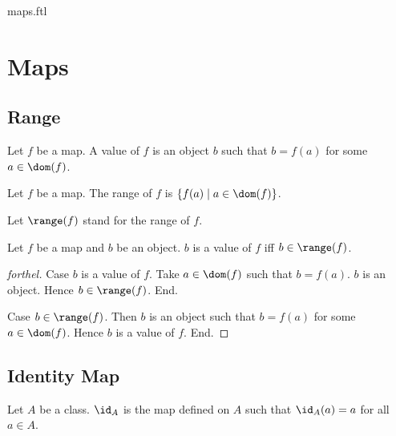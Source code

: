 \documentclass{naproche-library}
\begin{document}
\begin{smodule}{maps.ftl}


  \section*{Maps}

  \subsection*{Range}

  \begin{definition}[forthel,id=FOUNDATIONS_06_4284980337311744,printid]
    Let $f$ be a map.
    A value of $f$ is an object $b$ such that $b = f(a)$ for some $a \in \dom(f)$.
  \end{definition}

  \begin{definition}[forthel,id=FOUNDATIONS_06_1938831225913344,printid]
    Let $f$ be a map.
    The range of $f$ is $\{ f(a) \mid a \in \dom(f) \}$.

    Let $\range(f)$ stand for the range of $f$.
  \end{definition}

  \begin{proposition}[forthel,id=FOUNDATIONS_06_6386349418479616,printid]
    Let $f$ be a map and $b$ be an object.
    $b$ is a value of $f$ iff $b \in \range(f)$.
  \end{proposition}
  \begin{proof}[forthel]
    Case $b$ is a value of $f$.
      Take $a \in \dom(f)$ such that $b = f(a)$.
      $b$ is an object.
      Hence $b \in \range(f)$.
    End.

    Case $b \in \range(f)$.
      Then $b$ is an object such that $b = f(a)$ for some $a \in \dom(f)$.
      Hence $b$ is a value of $f$.
    End.
  \end{proof}


  \subsection*{Identity Map}

  \begin{definition}[forthel,id=FOUNDATIONS_06_1920902360989696,printid]
    Let $A$ be a class.
    $\id_{A}$ is the map defined on $A$ such that $\id_{A}(a) = a$ for all $a \in A$.


\end{definition}
\end{smodule}
\end{document}

